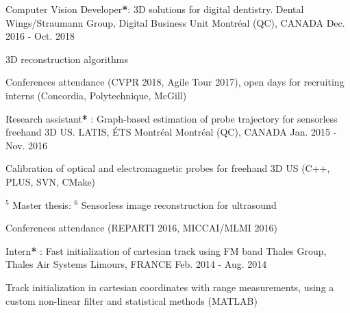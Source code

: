 \begin{cventries}

\cventry
{Computer Vision Developer\textbf{*}: 3D solutions for digital dentistry.}%
{Dental Wings/Straumann Group, Digital Business Unit} %
{\hspace{-5mm}Montréal (QC), CANADA} %
{Dec. 2016 - Oct. 2018} %
{ %
\begin{cvitems}
\item {3D reconstruction algorithms}
\item {Conferences attendance (CVPR 2018, Agile Tour 2017), open days for recruiting interns (Concordia, Polytechnique, McGill)}
\end{cvitems}
}


\cventry
{Research assistant\textbf{*} : Graph-based estimation of probe trajectory for sensorless freehand 3D US.}%
{LATIS, ÉTS Montréal} %
{\hspace{-5mm}Montréal (QC), CANADA} %
{Jan. 2015 - Nov. 2016} %
{ %
\begin{cvitems}
\item {Calibration of optical and electromagnetic probes for freehand 3D US (C++, PLUS, SVN, CMake)}
\item {\hyperref[award:5]{$^5$} Master thesis: \hyperref[award:6]{$^6$} Sensorless image reconstruction for ultrasound}
\item {Conferences attendance (REPARTI 2016, MICCAI/MLMI 2016)}
\end{cvitems}
}


\cventry
{Intern\textbf{*} : Fast initialization of cartesian track using FM band} %
{Thales Group, Thales Air Systems} %
{Limours, FRANCE} %
{Feb. 2014 - Aug. 2014} %
{ %
\begin{cvitems}
\item {Track initialization in cartesian coordinates with range measurements, using a custom non-linear filter and statistical methods (MATLAB)}
\end{cvitems}
}
\end{cventries}
